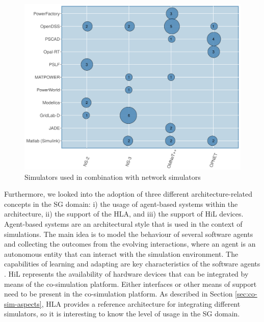 \documentclass[1p]{elsarticle} %
\begin{document}
\begin{figure}[!htb]
\centering
\includegraphics[width=0.95\linewidth]{img/power-vs-network.png}
\caption{Simulators used in combination with network simulators}
\label{fig:heat-sim}
\end{figure}




Furthermore, we looked into the adoption of three different architecture-related concepts in the SG domain: i) the usage of agent-based systems within the architecture, ii) the support of the HLA, and iii) the support of HiL devices. Agent-based systems are an architectural style that is used in the context of simulations. The main idea is to model the behaviour of several software agents and collecting the outcomes from the evolving interactions, where an agent is an autonomous entity that can interact with the simulation environment. The capabilities of learning and adapting are key characteristics of the software agents \citep{ref:law2000simulation}. HiL represents the availability of hardware devices that can be integrated by means of the co-simulation platform. Either interfaces or other means of support need to be present in the co-simulation platform. As described in Section \ref{sec:co-sim-aspects}, HLA provides a reference architecture for integrating different simulators, so it is interesting to know the level of usage in the SG domain. 
\end{document}
